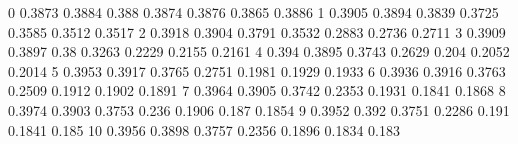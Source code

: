 0	0.3873	0.3884	0.388	0.3874	0.3876	0.3865	0.3886
1	0.3905	0.3894	0.3839	0.3725	0.3585	0.3512	0.3517
2	0.3918	0.3904	0.3791	0.3532	0.2883	0.2736	0.2711
3	0.3909	0.3897	0.38	0.3263	0.2229	0.2155	0.2161
4	0.394	0.3895	0.3743	0.2629	0.204	0.2052	0.2014
5	0.3953	0.3917	0.3765	0.2751	0.1981	0.1929	0.1933
6	0.3936	0.3916	0.3763	0.2509	0.1912	0.1902	0.1891
7	0.3964	0.3905	0.3742	0.2353	0.1931	0.1841	0.1868
8	0.3974	0.3903	0.3753	0.236	0.1906	0.187	0.1854
9	0.3952	0.392	0.3751	0.2286	0.191	0.1841	0.185
10	0.3956	0.3898	0.3757	0.2356	0.1896	0.1834	0.183
